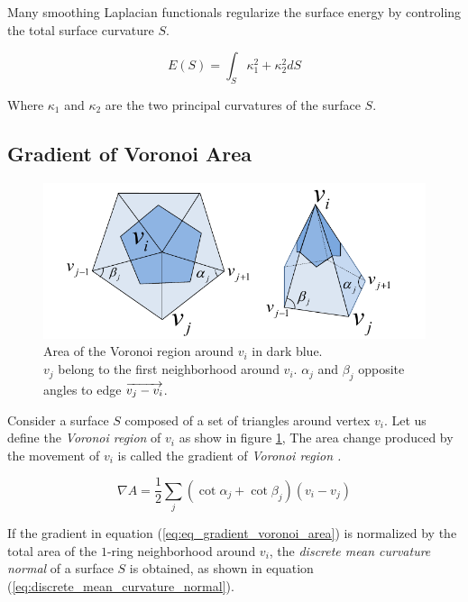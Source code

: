 \documentclass[10pt, conference]{IEEEtran}
\begin{document}
Many smoothing Laplacian functionals regularize the surface energy
by controling the total surface curvature $S$.

\begin{equation}
E\left(S\right)=\int_{S}\kappa_{1}^{2}+\kappa_{2}^{2}dS\label{eq:total_cuarvature_integral}
\end{equation}


Where $\kappa_{1}$ and $\kappa_{2}$ are the two principal curvatures
of the surface $S$.


\subsection{Gradient of Voronoi Area}

\begin{figure}[h]
\includegraphics[width=1\columnwidth]{figs/voronoi_region}

\caption{\label{fig:voronoi_region}Area of the Voronoi region around $v_{i}$
in dark blue.\protect \\
 $v_{j}$ belong to the first neighborhood around $v_{i}$. $\alpha_{j}$
and $\beta_{j}$ opposite angles to edge $\protect\overrightarrow{v_{j}-v_{i}}$. }
\end{figure}


Consider a surface $S$ composed of a set of triangles around vertex
$v_{i}$. Let us define the \textit{Voronoi region} of $v_{i}$ as
show in figure \ref{fig:voronoi_region}, The area change produced
by the movement of $v_{i}$ is called the gradient of \textit{Voronoi
region \cite{Pinkall1993,Desbrun1999,Meyer2003}.}

\begin{equation}
\nabla A=\frac{1}{2}\underset{j}{\sum}\left(\cot\alpha_{j}+\cot\beta_{j}\right)\left(v_{i}-v_{j}\right)\label{eq:eq_gradient_voronoi_area}
\end{equation}


If the gradient in equation (\ref{eq:eq_gradient_voronoi_area}) is
normalized by the total area of the $1$-ring neighborhood around
$v_{i}$, the \textit{discrete mean curvature normal} of a surface
$S$ is obtained, as shown in equation (\ref{eq:discrete_mean_curvature_normal}).
\end{document}
